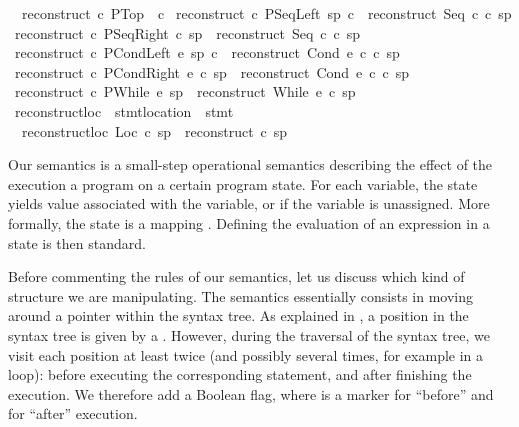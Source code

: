 \begin{isabellebody}
\ \ {\isachardoublequoteopen}reconstruct\ c\ PTop\ {\isacharequal}\ c{\isachardoublequoteclose}\isanewline
{\isacharbar}\ {\isachardoublequoteopen}reconstruct\ c\ {\isacharparenleft}PSeqLeft\ sp\ c{}{\isacharparenright}\ {\isacharequal}\ reconstruct\ {\isacharparenleft}Seq\ c\ c{}{\isacharparenright}\ sp{\isachardoublequoteclose}\isanewline
{\isacharbar}\ {\isachardoublequoteopen}reconstruct\ c\ {\isacharparenleft}PSeqRight\ c{}\ sp{\isacharparenright}\ {\isacharequal}\ reconstruct\ {\isacharparenleft}Seq\ c{}\ c{\isacharparenright}\ sp{\isachardoublequoteclose}\isanewline
{\isacharbar}\ {\isachardoublequoteopen}reconstruct\ c\ {\isacharparenleft}PCondLeft\ e\ sp\ c{}{\isacharparenright}\ {\isacharequal}\ reconstruct\ {\isacharparenleft}Cond\ e\ c\ c{}{\isacharparenright}\ sp{\isachardoublequoteclose}\isanewline
{\isacharbar}\ {\isachardoublequoteopen}reconstruct\ c\ {\isacharparenleft}PCondRight\ e\ c{}\ sp{\isacharparenright}\ {\isacharequal}\ reconstruct\ {\isacharparenleft}Cond\ e\ c{}\ c{\isacharparenright}\ sp{\isachardoublequoteclose}\isanewline
{\isacharbar}\ {\isachardoublequoteopen}reconstruct\ c\ {\isacharparenleft}PWhile\ e\ sp{\isacharparenright}\ {\isacharequal}\ reconstruct\ {\isacharparenleft}While\ e\ c{\isacharparenright}\ sp{\isachardoublequoteclose}\isanewline
\isanewline
\isanewline
{}\isamarkupfalse \ reconstruct{\isacharunderscore}loc\ {\isacharcolon}{\isacharcolon}\ {\isachardoublequoteopen}stmt{\isacharunderscore}location\ {\isasymRightarrow}\ stmt{\isachardoublequoteclose}\ \isanewline
\ \ {\isachardoublequoteopen}reconstruct{\isacharunderscore}loc\ {\isacharparenleft}Loc\ c\ sp{\isacharparenright}\ {\isacharequal}\ reconstruct\ c\ sp{\isachardoublequoteclose}\isanewline
{}
\isamarkuptrue \begin{isamarkuptext}Our semantics is a small-step operational semantics describing the
effect of the execution a program on a certain program state. For each
variable, the state yields  value associated with the variable, or
 if the variable is unassigned. More formally, the state is a
mapping .  Defining the evaluation of an
expression in a state is then standard. 

Before commenting the rules of our semantics, let us discuss which kind
of structure we are manipulating. The semantics essentially consists in moving
around a pointer within the syntax tree. As explained in , a
position in the syntax tree is given by a . However,
during the traversal of the syntax tree, we visit each position at least twice
(and possibly several times, for example in a loop): before executing the
corresponding statement, and after finishing the execution. We therefore add a
Boolean flag, where  is a marker for ``before'' and 
for ``after'' execution. 


\end{isamarkuptext}
\end{isabellebody}
